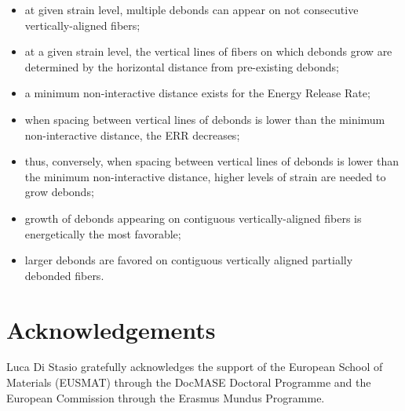 \documentclass[review]{elsarticle}
\begin{document}
\begin{itemize}
\item at given strain level, multiple debonds can appear on not consecutive vertically-aligned fibers;
\item at a given strain level, the vertical lines of fibers on which debonds grow are determined by the horizontal distance from pre-existing debonds;
\item a minimum non-interactive distance exists for the Energy Release Rate;
\item when spacing between vertical lines of debonds is lower than the minimum non-interactive distance, the ERR decreases;
\item thus, conversely, when spacing between vertical lines of debonds is lower than the minimum non-interactive distance, higher levels of strain are needed to grow debonds;
\item growth of debonds appearing on contiguous vertically-aligned fibers is energetically the most favorable;
\item larger debonds are favored on contiguous vertically aligned partially debonded fibers.
\end{itemize}


\section*{Acknowledgements}

Luca Di Stasio gratefully acknowledges the support of the European School of Materials (EUSMAT) through the DocMASE Doctoral Programme and the European Commission through the Erasmus Mundus Programme.


\end{document}

